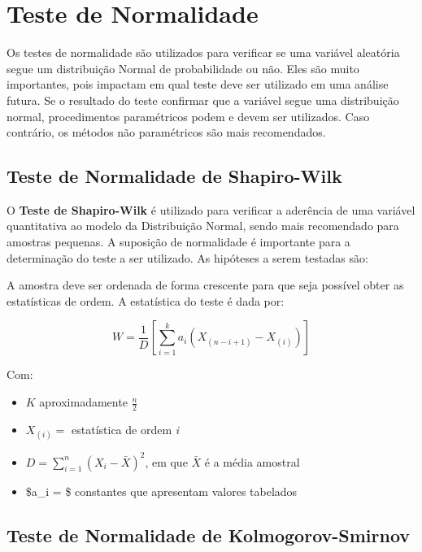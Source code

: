 \documentclass[
]{estat/estat}
\begin{document}
\hypertarget{teste-de-normalidade}{%
\section{Teste de Normalidade}\label{teste-de-normalidade}}

Os testes de normalidade são utilizados para verificar se uma variável
aleatória segue um distribuição Normal de probabilidade ou não. Eles são
muito importantes, pois impactam em qual teste deve ser utilizado em uma
análise futura. Se o resultado do teste confirmar que a variável segue
uma distribuição normal, procedimentos paramétricos podem e devem ser
utilizados. Caso contrário, os métodos não paramétricos são mais
recomendados.

\hypertarget{teste-de-normalidade-de-shapiro-wilk}{%
\subsection{Teste de Normalidade de
Shapiro-Wilk}\label{teste-de-normalidade-de-shapiro-wilk}}

O \textbf{Teste de Shapiro-Wilk} é utilizado para verificar a aderência
de uma variável quantitativa ao modelo da Distribuição Normal, sendo
mais recomendado para amostras pequenas. A suposição de normalidade é
importante para a determinação do teste a ser utilizado. As hipóteses a
serem testadas são:


A amostra deve ser ordenada de forma crescente para que seja possível
obter as estatísticas de ordem. A estatística do teste é dada por:

\[ W = \frac{1}{D} \left[ \sum_{i=1}^{k} a_{i} \left(X_{(n-i+1)} - X_{(i)}\right) \right] \]

Com:

\begin{itemize}
\item
  \(K\) aproximadamente \(\displaystyle\frac{n}{2}\)
\item
  \(X_{\left(i\right)} =\) estatística de ordem \emph{i}
\item
  \(D = \displaystyle \sum_{i=1}^{n}(X_{i} - \bar{X})^2\), em que
  \(\bar{X}\) é a média amostral
\item
  \$a\_i = \$ constantes que apresentam valores tabelados
\end{itemize}

\hypertarget{teste-de-normalidade-de-kolmogorov-smirnov}{%
\subsection{Teste de Normalidade de
Kolmogorov-Smirnov}\label{teste-de-normalidade-de-kolmogorov-smirnov}}
\end{document}
